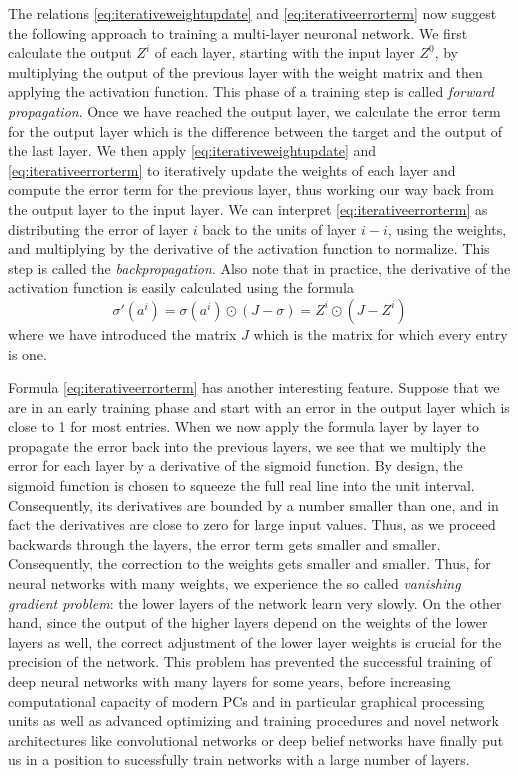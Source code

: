 \documentclass[a4paper, draft]{report}
\numberwithin{section}{chapter}
\numberwithin{equation}{chapter}
\theoremstyle{own}
\theoremstyle{remark}
\begin{document}
The relations \eqref{eq:iterativeweightupdate} and \eqref{eq:iterativeerrorterm} now suggest the following approach to training a multi-layer neuronal network. We first calculate the output $Z^i$ of each layer, starting with the input layer $Z^0$, by multiplying the output of the previous layer with the weight matrix and then applying the activation function. This phase of a training step is called {\em forward propagation}. Once we have reached the output layer, we calculate the error term for the output layer which is the difference between the target and the output of the last layer. We then apply \eqref{eq:iterativeweightupdate} and \eqref{eq:iterativeerrorterm} to iteratively update the weights of each layer and compute the error term for the previous layer, thus working our way back from the output layer to the input layer. We can interpret \eqref{eq:iterativeerrorterm} as distributing the error of layer $i$ back to the units of layer $i-i$, using the weights, and multiplying by the derivative of the activation function to normalize. This step is called the {\em backpropagation}.  Also note that in practice, the derivative of the activation function is easily calculated using the formula
$$
\sigma' (a^i) = \sigma(a^i) \odot (J-\sigma) = Z^i \odot (J - Z^i)
$$
where we have introduced the matrix $J$ which is the matrix for which every entry is one. 

Formula \eqref{eq:iterativeerrorterm} has another interesting feature. Suppose that we are in an early training phase and start with an error in the output layer which is close to 1 for most entries. When we now apply the formula layer by layer to propagate the error back into the previous layers, we see that we multiply the error for each layer by a derivative of the sigmoid function. By design, the sigmoid function is chosen to squeeze the full real line into the unit interval. Consequently, its derivatives are bounded by a number smaller than one, and in fact the derivatives are close to zero for large input values. Thus, as we proceed backwards through the layers, the error term gets smaller and smaller. Consequently, the correction to the weights gets smaller and smaller. Thus, for neural networks with many weights, we experience the so called {\em vanishing gradient problem}: the lower layers of the network learn very slowly. On the other hand, since the output of the higher layers depend on the weights of the lower layers as well, the correct adjustment of the lower layer weights is crucial for the precision of the network. This problem has prevented the successful training of deep neural networks with many layers for some years, before increasing computational capacity of modern PCs and in particular graphical processing units as well as advanced optimizing and training procedures and novel network architectures like convolutional networks or deep belief networks have finally put us in a position to sucessfully train networks with a large number of layers.
\end{document}
